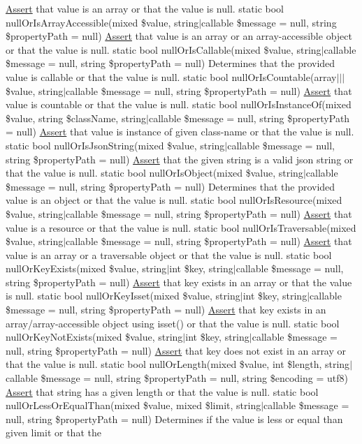 \mbox{\hyperlink{class_assert_1_1_assert}{Assert}} that value is an array or that the value is null.  static bool null\+Or\+Is\+Array\+Accessible(mixed \$value, string$\vert$callable \$message = null, string \$property\+Path = null) \mbox{\hyperlink{class_assert_1_1_assert}{Assert}} that value is an array or an array-\/accessible object or that the value is null.  static bool null\+Or\+Is\+Callable(mixed \$value, string$\vert$callable \$message = null, string \$property\+Path = null) Determines that the provided value is callable or that the value is null.  static bool null\+Or\+Is\+Countable(array$\vert$$\vert$$\vert$ \$value, string$\vert$callable \$message = null, string \$property\+Path = null) \mbox{\hyperlink{class_assert_1_1_assert}{Assert}} that value is countable or that the value is null.  static bool null\+Or\+Is\+Instance\+Of(mixed \$value, string \$class\+Name, string$\vert$callable \$message = null, string \$property\+Path = null) \mbox{\hyperlink{class_assert_1_1_assert}{Assert}} that value is instance of given class-\/name or that the value is null.  static bool null\+Or\+Is\+Json\+String(mixed \$value, string$\vert$callable \$message = null, string \$property\+Path = null) \mbox{\hyperlink{class_assert_1_1_assert}{Assert}} that the given string is a valid json string or that the value is null.  static bool null\+Or\+Is\+Object(mixed \$value, string$\vert$callable \$message = null, string \$property\+Path = null) Determines that the provided value is an object or that the value is null.  static bool null\+Or\+Is\+Resource(mixed \$value, string$\vert$callable \$message = null, string \$property\+Path = null) \mbox{\hyperlink{class_assert_1_1_assert}{Assert}} that value is a resource or that the value is null.  static bool null\+Or\+Is\+Traversable(mixed \$value, string$\vert$callable \$message = null, string \$property\+Path = null) \mbox{\hyperlink{class_assert_1_1_assert}{Assert}} that value is an array or a traversable object or that the value is null.  static bool null\+Or\+Key\+Exists(mixed \$value, string$\vert$int \$key, string$\vert$callable \$message = null, string \$property\+Path = null) \mbox{\hyperlink{class_assert_1_1_assert}{Assert}} that key exists in an array or that the value is null.  static bool null\+Or\+Key\+Isset(mixed \$value, string$\vert$int \$key, string$\vert$callable \$message = null, string \$property\+Path = null) \mbox{\hyperlink{class_assert_1_1_assert}{Assert}} that key exists in an array/array-\/accessible object using isset() or that the value is null.  static bool null\+Or\+Key\+Not\+Exists(mixed \$value, string$\vert$int \$key, string$\vert$callable \$message = null, string \$property\+Path = null) \mbox{\hyperlink{class_assert_1_1_assert}{Assert}} that key does not exist in an array or that the value is null.  static bool null\+Or\+Length(mixed \$value, int \$length, string$\vert$callable \$message = null, string \$property\+Path = null, string \$encoding = \textquotesingle{}utf8\textquotesingle{}) \mbox{\hyperlink{class_assert_1_1_assert}{Assert}} that string has a given length or that the value is null.  static bool null\+Or\+Less\+Or\+Equal\+Than(mixed \$value, mixed \$limit, string$\vert$callable \$message = null, string \$property\+Path = null) Determines if the value is less or equal than given limit or that the 